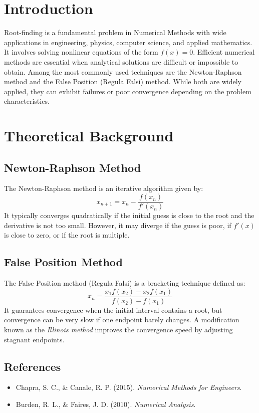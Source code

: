 \documentclass[12pt,a4paper]{article}
\begin{document}
\section{Introduction}
Root-finding is a fundamental problem in Numerical Methods with wide applications in 
engineering, physics, computer science, and applied mathematics. It involves solving 
nonlinear equations of the form $f(x) = 0$. Efficient numerical methods are essential 
when analytical solutions are difficult or impossible to obtain. Among the most commonly 
used techniques are the Newton-Raphson method and the False Position (Regula Falsi) 
method. While both are widely applied, they can exhibit failures or poor convergence 
depending on the problem characteristics. 

\section{Theoretical Background}

\subsection{Newton-Raphson Method}
The Newton-Raphson method is an iterative algorithm given by:
\begin{equation}
x_{n+1} = x_n - \frac{f(x_n)}{f'(x_n)}
\end{equation}
It typically converges quadratically if the initial guess is close to the root and the derivative is not too small. However, it may diverge if the guess is poor, if $f'(x)$ is close to zero, or if the root is multiple.

\subsection{False Position Method}
The False Position method (Regula Falsi) is a bracketing technique defined as:
\begin{equation}
x_n = \frac{x_1 f(x_2) - x_2 f(x_1)}{f(x_2) - f(x_1)}
\end{equation}
It guarantees convergence when the initial interval contains a root, but convergence can be very slow if one endpoint barely changes. A modification known as the \textit{Illinois method} improves the convergence speed by adjusting stagnant endpoints.

\subsection{References}
\begin{itemize}
    \item Chapra, S. C., \& Canale, R. P. (2015). \textit{Numerical Methods for Engineers}.
    \item Burden, R. L., \& Faires, J. D. (2010). \textit{Numerical Analysis}.
\end{itemize}
\end{document}
